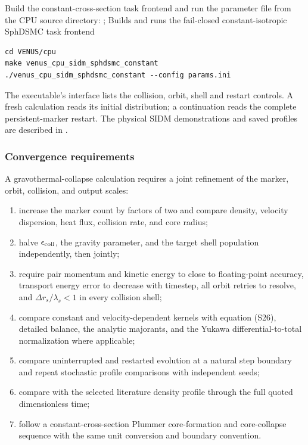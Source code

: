 Build the constant-cross-section task frontend and run the parameter file from
the CPU source directory:
{;
 }
{Builds and runs the fail-closed constant-isotropic SphDSMC task frontend}
\begin{lstlisting}[basicstyle=\ttfamily\scriptsize]
cd VENUS/cpu
make venus_cpu_sidm_sphdsmc_constant
./venus_cpu_sidm_sphdsmc_constant --config params.ini
\end{lstlisting}
The executable's  interface lists the collision, orbit, shell
and restart controls. A fresh calculation reads its initial distribution;
a continuation reads the complete persistent-marker restart. The physical
SIDM demonstrations and saved profiles are described in .

\subsubsection{Convergence requirements}

A gravothermal-collapse calculation requires a joint refinement of the
marker, orbit, collision, and output scales:
\begin{enumerate}
\item increase the marker count by factors of two and compare density,
velocity dispersion, heat flux, collision rate, and core radius;
\item halve \(\epsilon_{\rm coll}\), the gravity parameter, and the target
shell population independently, then jointly;
\item require pair momentum and kinetic energy to close to floating-point
accuracy, transport energy error to decrease with timestep, all orbit retries
to resolve, and \(\Delta r_s/\lambda_s<1\) in every collision shell;
\item compare constant and velocity-dependent kernels with equation (S26),
detailed balance, the analytic majorants, and the Yukawa differential-to-total
normalization where applicable;
\item compare uninterrupted and restarted evolution at a natural step
boundary and repeat stochastic profile comparisons with independent seeds;
\item compare with the selected literature density profile through the
      full quoted dimensionless time;
\item follow a constant-cross-section Plummer core-formation and core-collapse
      sequence with the same unit conversion and boundary convention.
\end{enumerate}
